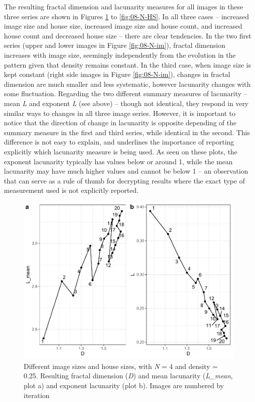\documentclass[
  12pt,
  a4paper, twoside]{book}
\begin{document}
The resulting fractal dimension and lacunarity measures for all images in these three series are shown in Figures \ref{fig:08-IS-HS} to \ref{fig:08-N-HS}. In all three cases -- increased image size and house size, increased image size and house count, and increased house count and decreased house size -- there are clear tendencies. In the two first series (upper and lower images in Figure \ref{fig:08-N-im}), fractal dimension increases with image size, seemingly independently from the evolution in the pattern given that density remains constant. In the third case, when image size is kept constant (right side images in Figure \ref{fig:08-N-im}), changes in fractal dimension are much smaller and less systematic, however lacunarity changes with some fluctuation. Regarding the two different summary measures of lacunarity -- mean \emph{L} and exponent \emph{L} (see above) -- though not identical, they respond in very similar ways to changes in all three image series. However, it is important to notice that the direction of change in lacunarity is opposite depending of the summary measure in the first and third series, while identical in the second. This difference is not easy to explain, and underlines the importance of reporting explicitly which lacunarity measure is being used. As seen on these plots, the exponent lacunarity typically has values below or around 1, while the mean lacunarity may have much higher values and cannot be below 1 -- an observation that can serve as a rule of thumb for decrypting results where the exact type of measurement used is not explicitly reported.



\begin{figure}

{\centering \includegraphics[width=0.9\linewidth]{bookdown-demo_files/figure-latex/08-IS-HS-1} 

}

\caption[D and L estimates, variable image size and house size (resolution)]{Different image sizes and house sizes, with \emph{N} = 4 and density = 0.25. Resulting fractal dimension (\emph{D}) and mean lacunarity (\emph{L\_mean}, plot a) and exponent lacunarity (plot b). Images are numbered by iteration}\label{fig:08-IS-HS}
\end{figure}
\end{document}
